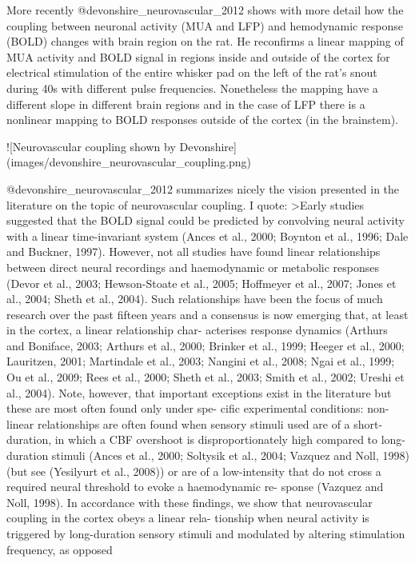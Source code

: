 More recently @devonshire_neurovascular_2012 shows with more detail how the coupling between neuronal activity (MUA and LFP) and hemodynamic response (BOLD) changes with brain region on the rat. He reconfirms a linear mapping of MUA activity and BOLD signal in regions inside and outside of the cortex for electrical stimulation of the entire whisker pad on the left of the rat's snout during 40s with different pulse frequencies. Nonetheless the mapping have a different slope in different brain regions and in the case of LFP there is a nonlinear mapping to BOLD responses outside of the cortex (in the brainstem).

![Neurovascular coupling shown by Devonshire](images/devonshire_neurovascular_coupling.png)

@devonshire_neurovascular_2012 summarizes nicely the vision presented in the literature on the topic of neurovascular coupling. I quote:
>Early studies suggested that the BOLD signal could be predicted by
convolving neural activity with a linear time-invariant system (Ances
et al., 2000; Boynton et al., 1996; Dale and Buckner, 1997). However,
not all studies have found linear relationships between direct neural
recordings and haemodynamic or metabolic responses (Devor et al.,
2003; Hewson-Stoate et al., 2005; Hoffmeyer et al., 2007; Jones
et al., 2004; Sheth et al., 2004). Such relationships have been the
focus of much research over the past fifteen years and a consensus
is now emerging that, at least in the cortex, a linear relationship char-
acterises response dynamics (Arthurs and Boniface, 2003; Arthurs
et al., 2000; Brinker et al., 1999; Heeger et al., 2000; Lauritzen,
2001; Martindale et al., 2003; Nangini et al., 2008; Ngai et al., 1999;
Ou et al., 2009; Rees et al., 2000; Sheth et al., 2003; Smith et al.,
2002; Ureshi et al., 2004). Note, however, that important exceptions
exist in the literature but these are most often found only under spe-
cific experimental conditions: non-linear relationships are often
found when sensory stimuli used are of a short-duration, in which a
CBF overshoot is disproportionately high compared to long-duration
stimuli (Ances et al., 2000; Soltysik et al., 2004; Vazquez and Noll,
1998) (but see (Yesilyurt et al., 2008)) or are of a low-intensity that
do not cross a required neural threshold to evoke a haemodynamic re-
sponse (Vazquez and Noll, 1998). In accordance with these findings,
we show that neurovascular coupling in the cortex obeys a linear rela-
tionship when neural activity is triggered by long-duration sensory
stimuli and modulated by altering stimulation frequency, as opposed
